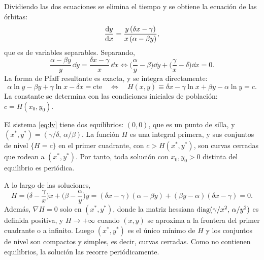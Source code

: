 \documentclass[11pt,twoside]{article}
\begin{document}
Dividiendo las dos ecuaciones se elimina el tiempo y se obtiene la ecuación de las órbitas:
\begin{equation}\label{eq:lvorb}
\frac{\mathrm{d}y}{\mathrm{d}x}=\frac{y\,(\delta x-\gamma)}{x\,(\alpha-\beta y)},
\end{equation}
que es de variables separables. Separando,
\begin{equation*}
\frac{\alpha-\beta y}{y}\,\dd y=\frac{\delta x-\gamma}{x}\,\dd x\iff\Big(\frac\alpha y-\beta\Big)\dd y+\Big(\frac\gamma x-\delta\Big)\dd x=0.
\end{equation*}
La forma de Pfaff resultante es exacta, y se integra directamente:
\begin{equation}\label{eq:lvH}
\alpha\ln y-\beta y+\gamma\ln x-\delta x=\text{cte}\quad\iff\quad H(x,y)\equiv\delta x-\gamma\ln x+\beta y-\alpha\ln y=c.
\end{equation}
La constante se determina con las condiciones iniciales de población: $c=H(x_0,y_0)$.

\begin{teorema}\label{teo:lv}
El sistema \eqref{eq:lv} tiene dos equilibrios: $(0,0)$, que es un punto de silla, y $(x^*,y^*)=(\gamma/\delta,\,\alpha/\beta)$.
La función $H$ es una integral primera, y sus conjuntos de nivel $\{H=c\}$ en el primer cuadrante, con $c>H(x^*,y^*)$, son
curvas cerradas que rodean a $(x^*,y^*)$. Por tanto, toda solución con $x_0,y_0>0$ distinta del equilibrio es periódica.
\end{teorema}

\begin{demostracion}
A lo largo de las soluciones,
\begin{equation*}
\dot H=\Big(\delta-\frac\gamma x\Big)\dot x+\Big(\beta-\frac\alpha y\Big)\dot y=(\delta x-\gamma)(\alpha-\beta y)+(\beta y-\alpha)(\delta x-\gamma)=0.
\end{equation*}
Además, $\nabla H=0$ solo en $(x^*,y^*)$, donde la matriz hessiana $\operatorname{diag}(\gamma/x^2,\,\alpha/y^2)$ es definida positiva, y
$H\to+\infty$ cuando $(x,y)$ se aproxima a la frontera del primer cuadrante o a infinito. Luego $(x^*,y^*)$ es el único mínimo
de $H$ y los conjuntos de nivel son compactos y simples, es decir, curvas cerradas. Como no contienen equilibrios, la
solución las recorre periódicamente.
\end{demostracion}
\end{document}
